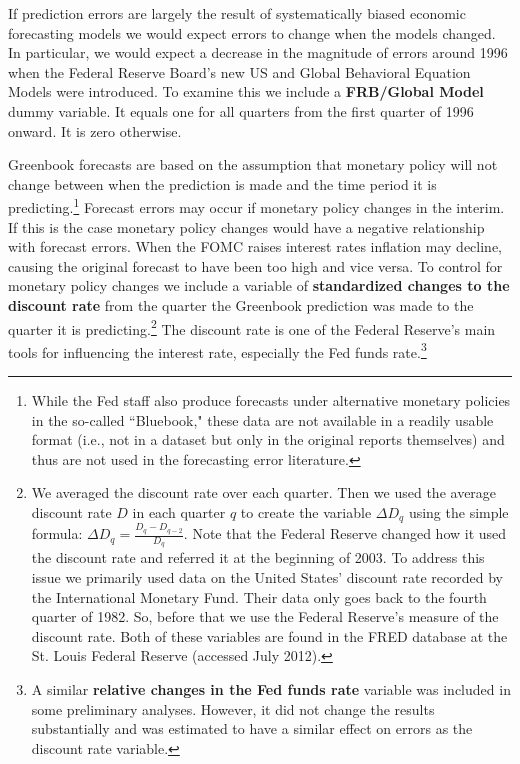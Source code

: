 \documentclass[a4paper]{article}\usepackage{graphicx, color}
\begin{document}
If prediction errors are largely the result of systematically biased economic forecasting models we would expect errors to change when the models changed. In particular, we would expect a decrease in the magnitude of errors around 1996 when the Federal Reserve Board's new US and Global Behavioral Equation Models were introduced. To examine this we include a {\bf{FRB/Global Model}} dummy variable. It equals one for all quarters from the first quarter of 1996 onward. It is zero otherwise.

Greenbook forecasts are based on the assumption that monetary policy will not change between when the prediction is made and the time period it is predicting.\footnote{While the Fed staff also produce forecasts under alternative monetary policies in the so-called ``Bluebook," these data are not available in a readily usable format (i.e., not in a dataset but only in the original reports themselves) and thus are not used in the forecasting error literature.} Forecast errors may occur if monetary policy changes in the interim. If this is the case monetary policy changes would have a negative relationship with forecast errors. When the FOMC raises interest rates inflation may decline, causing the original forecast to have been too high and vice versa. To control for monetary policy changes we include a variable of {\bf{standardized changes to the discount rate}} from the quarter the Greenbook prediction was made to the quarter it is predicting.\footnote{We averaged the discount rate over each quarter. Then we used the average discount rate $D$ in each quarter $q$ to create the variable $\Delta D_{q}$ using the simple formula: $\Delta D_{q} = \frac{D_{q} - D_{q-2}}{D_{q}}$. Note that the Federal Reserve changed how it used the discount rate and referred it at the beginning of 2003. To address this issue we primarily used data on the United States' discount rate recorded by the International Monetary Fund. Their data only goes back to the fourth quarter of 1982. So, before that we use the Federal Reserve's measure of the discount rate. Both of these variables are found in the FRED database at the St. Louis Federal Reserve (accessed July 2012). } The discount rate is one of the Federal Reserve's main tools for influencing the interest rate, especially the Fed funds rate.\footnote{A similar {\bf{relative changes in the Fed funds rate}} variable was included in some preliminary analyses. However, it did not change the results substantially and was estimated to have a similar effect on errors as the discount rate variable.}
\end{document}

